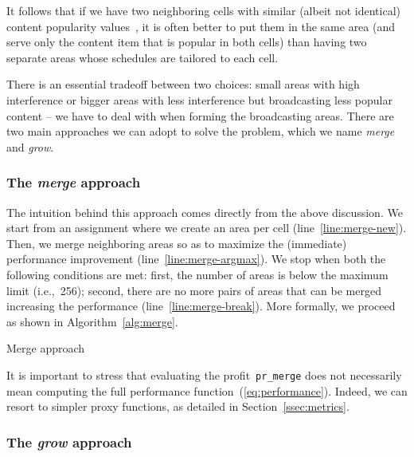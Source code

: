 \documentclass[10pt, conference, compsocconf]{IEEEtran}
\numberwithin{equation}{section}
\begin{document}
It follows that if we have two neighboring cells with similar (albeit not identical)
content popularity values~, it is often better to put them in the same area (and
serve only the content item that is popular in both cells) than having two separate areas
whose schedules are tailored to each cell.



There is an essential tradeoff between two choices: small areas with high interference
or bigger areas with less interference but broadcasting less popular content -- we have to
deal with when forming the broadcasting areas. There are two main
approaches we can adopt to solve the problem, 
which we name {\em merge} and {\em grow}.

\subsubsection{The {\em merge} approach}

The intuition behind this approach comes directly from the above discussion. We start from
an assignment where we create an area per cell (line~\ref{line:merge-new}). Then, we merge neighboring areas so as to
maximize the (immediate) performance improvement (line~\ref{line:merge-argmax}). We stop when both the following conditions
are met: first, the number of areas is below the maximum limit  (i.e.,~256); second, there are no more
pairs of areas that can be merged increasing the performance (line~\ref{line:merge-break}). More formally, we proceed as shown in Algorithm~\ref{alg:merge}.

\begin{algorithm}
\begin{algorithmic}[1]
\Require{}
\State{}
\ForAll{}
\State{} \label{line:merge-new}
\State{} \label{line:merge-add}
\EndFor
{}
\State{} \label{line:merge-argmax}
\If{}
 \label{line:merge-break}
\EndIf
\State{} \label{line:merge-merge}
\State{}
\EndWhile
\State\Return{}
\end{algorithmic}
\caption{\label{alg:merge}Merge approach}
\end{algorithm}



It is important to stress that evaluating the profit~\texttt{pr\_merge} does not necessarily mean
computing the full performance function~(\ref{eq:performance}). Indeed, we can resort
to simpler proxy functions, as detailed in Section~\ref{ssec:metrics}.

\subsubsection{The {\em grow} approach}
\end{document}
